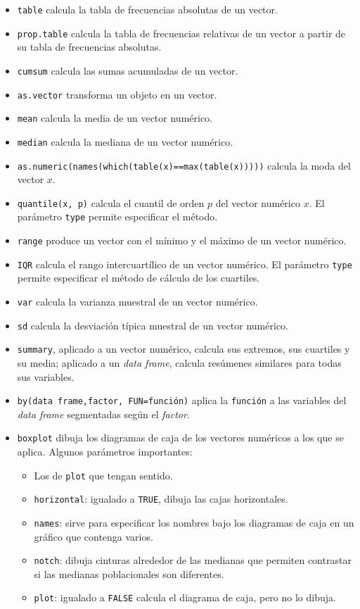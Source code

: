 \documentclass[
]{book}
\theoremstyle{definition}
\theoremstyle{definition}
\theoremstyle{definition}
\theoremstyle{remark}
\begin{document}
\begin{itemize}
\item
  \texttt{table} calcula la tabla de frecuencias absolutas de un vector.
\item
  \texttt{prop.table} calcula la tabla de frecuencias relativas de un vector a partir de su tabla de frecuencias absolutas.
\item
  \texttt{cumsum} calcula las sumas acumuladas de un vector.
\item
  \texttt{as.vector} transforma un objeto en un vector.
\item
  \texttt{mean} calcula la media de un vector numérico.
\item
  \texttt{median} calcula la mediana de un vector numérico.
\item
  \texttt{as.numeric(names(which(table(x)==max(table(x)))))} calcula la moda del vector \(x\).
\item
  \texttt{quantile(x,\ p)} calcula el cuantil de orden \(p\) del vector numérico \(x\). El parámetro \texttt{type} permite especificar el método.
\item
  \texttt{range} produce un vector con el mínimo y el máximo de un vector numérico.
\item
  \texttt{IQR} calcula el rango intercuartílico de un vector numérico. El parámetro \texttt{type} permite especificar el método de cálculo de los cuartiles.
\item
  \texttt{var} calcula la varianza muestral de un vector numérico.
\item
  \texttt{sd} calcula la desviación típica muestral de un vector numérico.
\item
  \texttt{summary}, aplicado a un vector numérico, calcula sus extremos, sus cuartiles y su media; aplicado a un \emph{data frame}, calcula resúmenes similares para todas sus variables.
\item
  \texttt{by(data\ frame,factor,\ FUN=función)} aplica la \texttt{función} a las variables del \emph{data frame} segmentadas según el \emph{factor}.
\item
  \texttt{boxplot} dibuja los diagramas de caja de los vectores numéricos a los que se aplica.
  Algunos parámetros importantes:

  \begin{itemize}
  \item
    Los de \texttt{plot} que tengan sentido.
  \item
    \texttt{horizontal}: igualado a \texttt{TRUE}, dibuja las cajas horizontales.
  \item
    \texttt{names}: sirve para especificar los nombres bajo los diagramas de caja en un gráfico que contenga varios.
  \item
    \texttt{notch}: dibuja cinturas alrededor de las medianas que permiten contrastar si las medianas poblacionales son diferentes.
  \item
    \texttt{plot}: igualado a \texttt{FALSE} calcula el diagrama de caja, pero no lo dibuja.
  \end{itemize}


\end{itemize}
\end{document}
